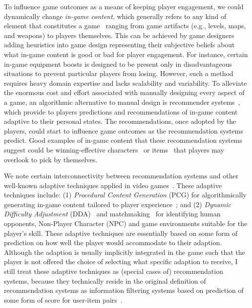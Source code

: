 To influence game outcomes as a means of keeping player engagement, we could dynamically change \textit{in-game content}, which generally refers to any kind of element that constitutes a game~\cite{ralph2015toward} ranging from game artifacts (e.g., levels, maps, and weapons) to players themselves. This can be achieved by game designers adding heuristics into game design representing their subjective beliefs about what in-game content is good or bad for player engagement. For instance, certain in-game equipment boosts is designed to be present only in disadvantageous situations to prevent particular players from losing. However, such a method requires heavy domain expertise and lacks scalability and variability. To alleviate the enormous cost and effort associated with manually designing every aspect of a game, an algorithmic alternative to manual design is recommender systems~\cite{medler2011using}, which provide to players predictions and recommendations of in-game content adaptive to their personal states. The recommendations, once adopted by the players, could start to influence game outcomes as the recommendation systems predict. Good examples of in-game content that these recommendation systems suggest could be winning-effective characters~\cite{hanke2017reco,summerville2017reco} or items~\cite{garcia2016evolutionary,bjorke2017deckbuilding} that players may overlook to pick by themselves.


We note certain interconnectivity between recommendation systems and other well-known adaptive techniques applied in video games~\cite{bakkes2012personalised,chen2015analytics}. These adaptive techniques include: (1) \textit{Procedural Content Generation} (PCG) for algorithmically generating in-game content tailored to player experience~\cite{yannakakis2011experience,togelius2011search}; and (2) \textit{Dynamic Difficulty Adjustment} (DDA)~\cite{hunicke2005case} and matchmaking~\cite{Delalleau2012,herbrich:trueskill} for identifying human opponents, Non-Player Character (NPC) and game environments suitable for the player's skill. These adaptive techniques are essentially based on some form of prediction on how well the player would accommodate to their adaption. Although the adaption is usually implicitly integrated in the game such that the player is not offered the choice of selecting what specific adaption to receive, I still treat these adaptive techniques as (special cases of) recommendation systems, because they technically reside in the original definition of recommendation systems as information filtering systems based on prediction of some form of score for user-item pairs~\cite{isinkaye2015recommendation,bobadilla2013recommender,resnick1997recommender,adomavicius2005toward}.

